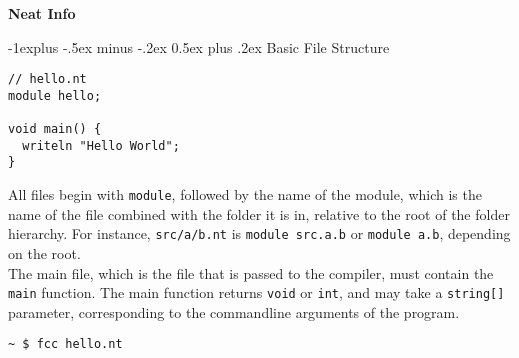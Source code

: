 \documentclass[a4paper,10pt,landscape]{article}
\makeatletter
\newenvironment{segment}[1]
{\begin{mdframed}[roundcorner=5pt]\subsection{#1}}
{\end{mdframed}\vspace{2pt plus 5pt}}
\renewcommand{\subsection}{\@startsection{subsection}{2}{0mm}%
			      {-1explus -.5ex minus -.2ex}%
			      {0.5ex plus .2ex}%
			      {\normalfont\normalsize\bfseries}}
\makeatother
\begin{document}
\raggedright
\footnotesize
\begin{multicols}{3}

\setlength{\premulticols}{1pt}
\setlength{\postmulticols}{1pt}
\setlength{\multicolsep}{1pt}
\setlength{\columnsep}{2pt}

\begin{center}
    \Large{\textbf{Neat Info}} \\
\end{center}

\begin{segment}{Basic File Structure}
\begin{lstlisting}
// hello.nt
module hello;

void main() {
  writeln "Hello World";
}
\end{lstlisting}

All files begin with \texttt{module}, followed by the name of the module, which is the name
of the file combined with the folder it is in, relative to the root of the folder hierarchy.
For instance, \texttt{src/a/b.nt} is \texttt{module src.a.b} or \texttt{module a.b},
depending on the root.\\

The main file, which is the file that is passed to the compiler,
must contain the \texttt{main} function. The main function returns \texttt{void}
or \texttt{int}, and may take a \texttt{string[]} parameter,
corresponding to the commandline arguments of the program.
\begin{lstlisting}
~ $ fcc hello.nt
\end{lstlisting}
\end{segment}


\end{multicols}
\end{document}
